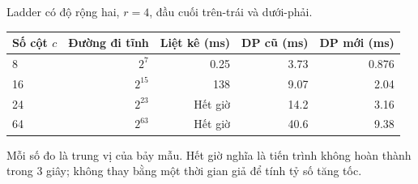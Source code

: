 \begin{table}[htbp]{Ladder có độ rộng hai, $r=4$, đầu cuối trên-trái và dưới-phải.}
\label{tab:ladder}
\centering\small
\setlength{\tabcolsep}{4pt}
\renewcommand{\arraystretch}{1.16}
\begin{tabular}{lrrrr}
\toprule
Số cột $c$ & Đường đi tĩnh & Liệt kê (ms) & DP cũ (ms) & DP mới (ms) \\
\midrule
8 & $2^{7}$ & \num{0.25} & \num{3.73} & \num{0.876} \\
16 & $2^{15}$ & \num{138} & \num{9.07} & \num{2.04} \\
24 & $2^{23}$ & Hết giờ & \num{14.2} & \num{3.16} \\
64 & $2^{63}$ & Hết giờ & \num{40.6} & \num{9.38} \\
\bottomrule
\end{tabular}
\par\vspace{3pt}\begin{minipage}{0.97\linewidth}\footnotesize Mỗi số đo là trung vị của bảy mẫu. Hết giờ nghĩa là tiến trình không hoàn thành trong 3 giây; không thay bằng một thời gian giả để tính tỷ số tăng tốc.\end{minipage}
\end{table}
